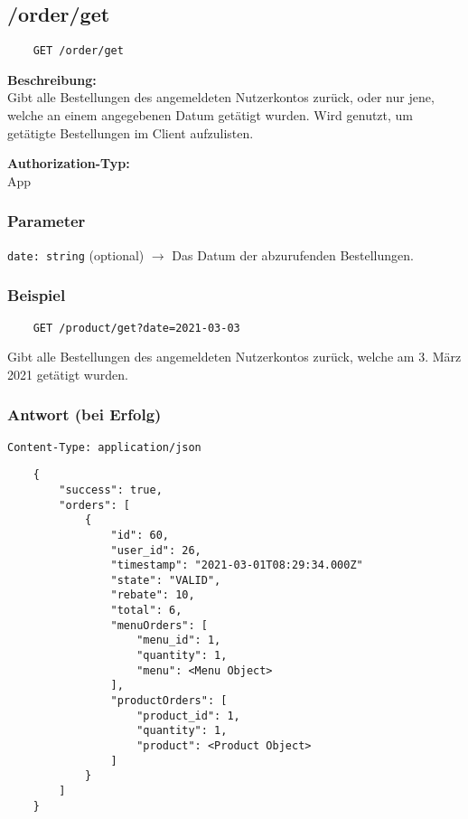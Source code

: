 \subsection{/order/get}

\begin{lstlisting}
    GET /order/get
\end{lstlisting}

\textbf{Beschreibung:} \\
Gibt alle Bestellungen des angemeldeten Nutzerkontos zurück, oder nur jene, welche an einem angegebenen Datum getätigt wurden. Wird genutzt, um getätigte Bestellungen im Client aufzulisten.

\textbf{Authorization-Typ:} \\
App

\subsubsection{Parameter}

\lstinline{date: string} (optional)
$\rightarrow$ Das Datum der abzurufenden Bestellungen.

\subsubsection{Beispiel}

\begin{lstlisting}
    GET /product/get?date=2021-03-03
\end{lstlisting}

Gibt alle Bestellungen des angemeldeten Nutzerkontos zurück, welche am 3. März 2021 getätigt wurden.

\subsubsection{Antwort (bei Erfolg)}

\lstinline{Content-Type: application/json}
\begin{lstlisting}
    {
        "success": true, 
        "orders": [
            {
                "id": 60,
                "user_id": 26,
                "timestamp": "2021-03-01T08:29:34.000Z"
                "state": "VALID",
                "rebate": 10,
                "total": 6,
                "menuOrders": [
                    "menu_id": 1,
                    "quantity": 1,
                    "menu": <Menu Object>
                ],
                "productOrders": [
                    "product_id": 1,
                    "quantity": 1,
                    "product": <Product Object>
                ]
            }
        ]
    }
\end{lstlisting}
